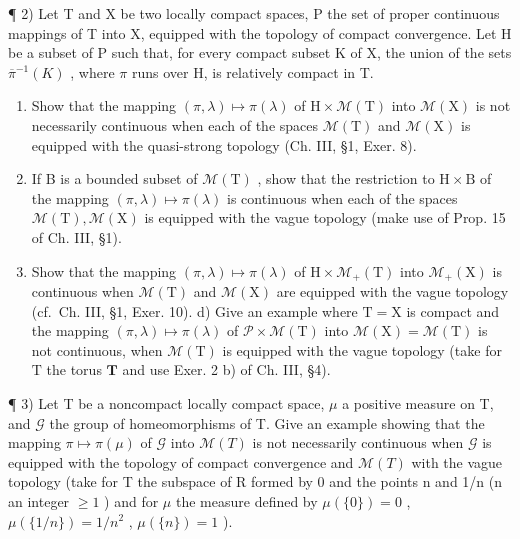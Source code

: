¶ 2) Let T and X be two locally compact spaces, P the set of proper continuous mappings of T into X, equipped with the topology of compact convergence. Let H be a subset of P such that, for every compact subset K of X, the union of the sets \(\overline{\pi}^{-1}(K)\) , where \(\pi\) runs over H, is relatively compact in T.

\begin{enumerate}
\def\labelenumi{\alph{enumi})}
\item
  Show that the mapping \((\pi, \lambda) \mapsto \pi(\lambda)\) of \(\mathrm{H} \times \mathcal{M}(\mathrm{T})\) into \(\mathcal{M}(\mathrm{X})\) is not necessarily continuous when each of the spaces \(\mathcal{M}(\mathrm{T})\) and \(\mathcal{M}(\mathrm{X})\) is equipped with the quasi-strong topology (Ch. III, §1, Exer. 8).
\item
  If B is a bounded subset of \(\mathcal{M}(\mathrm{T})\) , show that the restriction to \(\mathrm{H} \times \mathrm{B}\) of the mapping \((\pi, \lambda) \mapsto \pi(\lambda)\) is continuous when each of the spaces \(\mathcal{M}(\mathrm{T}), \mathcal{M}(\mathrm{X})\) is equipped with the vague topology (make use of Prop. 15 of Ch. III, §1).
\item
  Show that the mapping \((\pi, \lambda) \mapsto \pi(\lambda)\) of \(\mathrm{H} \times \mathcal{M}_{+}(\mathrm{T})\) into \(\mathcal{M}_{+}(\mathrm{X})\) is continuous when \(\mathcal{M}(\mathrm{T})\) and \(\mathcal{M}(\mathrm{X})\) are equipped with the vague topology (cf.~Ch. III, §1, Exer. 10). d) Give an example where \(\mathrm{T} = \mathrm{X}\) is compact and the mapping \((\pi, \lambda) \mapsto \pi(\lambda)\) of \(\mathcal{P} \times \mathcal{M}(\mathrm{T})\) into \(\mathcal{M}(\mathrm{X}) = \mathcal{M}(\mathrm{T})\) is not continuous, when \(\mathcal{M}(\mathrm{T})\) is equipped with the vague topology (take for \(\mathrm{T}\) the torus \(\mathbf{T}\) and use Exer. 2 b) of Ch. III, §4).
\end{enumerate}

¶ 3) Let T be a noncompact locally compact space, \(\mu\) a positive measure on T, and \(\mathcal{G}\) the group of homeomorphisms of T. Give an example showing that the mapping \(\pi \mapsto \pi(\mu)\) of \(\mathcal{G}\) into \(\mathcal{M}(T)\) is not necessarily continuous when \(\mathcal{G}\) is equipped with the topology of compact convergence and \(\mathcal{M}(T)\) with the vague topology (take for T the subspace of R formed by 0 and the points n and 1/n (n an integer \(\geqslant 1\) ) and for \(\mu\) the measure defined by \(\mu(\{0\}) = 0\) , \(\mu(\{1/n\}) = 1/n^2\) , \(\mu(\{n\}) = 1\) ).

